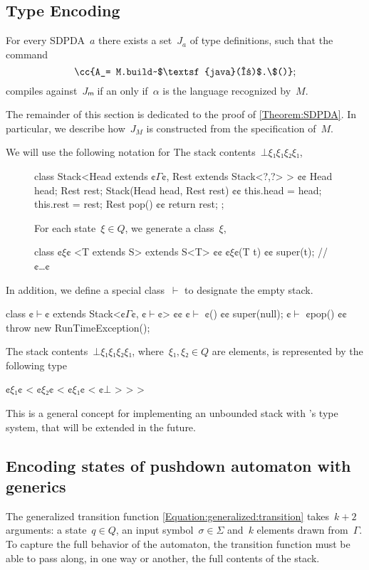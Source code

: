 \subsection{Type Encoding}
\begin{Theorem}
  \label{Theorem:SDPDA}
  For every SDPDA~$a$ there exists a set~$J_a$ of \Java type definitions, such that
  the command \[
    \cc{A_= M.build~$\textsf{java}(α)$.\$()};
  \]
  compiles against~$Jₘ$ if an only if~$α$ is the language recognized by~$M$.
\end{Theorem}

The remainder of this section is dedicated to the proof of \cref{Theorem:SDPDA}.
In particular, we describe how~$J_M$ is constructed from the
  specification of~$M$.

We will use the following notation for
The stack contents~$⊥ξ₁ξ₁ξ₂ξ₁$,

\begin{figure}[H]
\begin{JAVA}
class Stack<Head extends ¢$Γ$¢, Rest extends Stack<?,?> > {¢¢
  Head head;
  Rest rest;
  Stack(Head head, Rest rest) {¢¢ this.head = head; this.rest = rest;}
  Rest pop() {¢¢ return rest; };
}
\end{JAVA}
For each state~$ξ∈Q$, we generate a \Java class~$ξ$,
\begin{JAVA}
class ¢$ξ$¢ <T extends S> extends S<T> {¢¢
  ¢$ξ$¢(T t) {¢¢ super(t); }
  // ¢…¢
}
\end{JAVA}
\end{figure}
In addition, we define a special class~$\vdash$ to designate the empty stack.
\begin{JAVA}
class ¢$\vdash$¢ extends Stack<¢$Γ$¢, ¢$\vdash$¢> {¢¢
  ¢$\vdash$ ¢() {¢¢ super(null); }
  ¢$\vdash$ ¢pop() {¢¢ throw new RunTimeException(); }
}
\end{JAVA}
The stack contents~$⊥ξ₁ξ₁ξ₂ξ₁$,
where~$ξ₁,ξ₂∈Q$ are elements,
is represented by the following type
\begin{JAVA}
  ¢$ξ₁$¢ < ¢$ξ₂$¢ < ¢$ξ₁$¢ < ¢$⊥$ > > >
\end{JAVA}
This is a general concept for implementing an unbounded stack with \Java's type system,
that will be extended in the future.


\subsection{Encoding states of pushdown automaton with \Java generics}
The generalized transition function \cref{Equation:generalized:transition}
  takes~$k+2$ arguments: a state~$q∈Q$, an input symbol~$σ∈Σ$
    and~$k$ elements drawn from~$Γ$.
To capture the full behavior of the automaton, the transition function
  must be able to pass along, in one way or another, the full contents of the stack.

